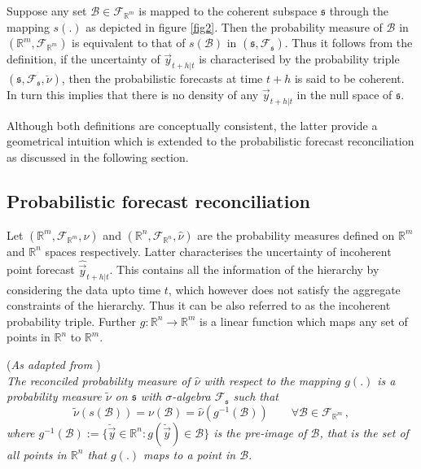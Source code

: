 \documentclass[graybox]{svmult}
\begin{document}
Suppose any set $\mathcal{B} \in \mathscr{F}_{\mathbb{R}^m}$ is mapped to the coherent subspace $\mathfrak{s}$ through the mapping $s(.)$ as depicted in figure \ref{fig2}. Then the probability measure of $\mathscr{B}$ in $(\mathbb{R}^m, \mathscr{F}_{\mathbb{R}^m})$ is equivalent to that of $s(\mathscr{B})$ in $(\mathfrak{s}, \mathscr{F}_{\mathfrak{s}})$. Thus it follows from the definition, if the uncertainty of $\vec{y}_{t+h|t}$ is characterised by the probability triple $(\mathfrak{s}, \mathscr{F}_{\mathfrak{s}}, \breve{\nu})$, then the probabilistic forecasts at time $t+h$ is said to be coherent. In turn this implies that there is no density of any $\vec{y}_{t+h|t}$ in the null space of $\mathfrak{s}$.  

Although both definitions are conceptually consistent, the latter provide a geometrical intuition which is extended to the probabilistic forecast reconciliation as discussed in the following section.

\subsection{Probabilistic forecast reconciliation}

Let $(\mathbb{R}^m, \mathscr{F}_{\mathbb{R}^m}, \nu)$ and $(\mathbb{R}^n, \mathscr{F}_{\mathbb{R}^n}, \hat{\nu})$ are the probability measures defined on $\mathbb{R}^m$ and $\mathbb{R}^n$ spaces respectively. Latter characterises the uncertainty of incoherent point forecast $\hat{\vec{y}}_{t+h|t}$. This contains all the information of the hierarchy by considering the data upto time $t$, which however does not satisfy the aggregate constraints of the hierarchy. Thus it can be also referred to as the incoherent probability triple. Further $g:\mathbb{R}^n \rightarrow \mathbb{R}^m $ is a linear function which maps any set of points in $\mathbb{R}^n$ to $\mathbb{R}^m$.  


\begin{definition}(\textit{As adapted from \cite{Gamakumara2018} })\label{def:reconprob}\\
	\textit{The reconciled probability measure of $\hat{\nu}$ with respect to the mapping $g(.)$ is a probability measure $\tilde{\nu}$ on $\mathfrak{s}$ with $\sigma$-algebra $\mathscr{F}_\mathfrak{s}$ such that
	\begin{equation}\label{eq:27}
	\tilde{\nu}(s(\mathcal{B})) = \nu(\mathcal{B})= \hat{\nu}(g^{-1}(\mathcal{B})) \qquad \forall \mathcal{B} \in \mathscr{F}_{\mathbb{R}^m}\,,
	\end{equation}
	where $g^{-1}(\mathcal{B}):=\{\breve{\vec{y}}\in \mathbb{R}^n:g(\breve{\vec{y}})\in \mathcal{B}\}$ is the pre-image of $\mathcal{B}$, that is the set of all points in $\mathbb{R}^n$ that $g(.)$ maps to a point in $\mathcal{B}$.}
\end{definition}
\end{document}
